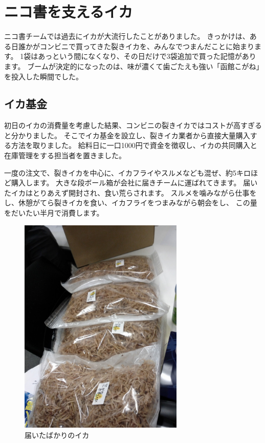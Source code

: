 \section{ニコ書を支えるイカ}

ニコ書チームでは過去にイカが大流行したことがありました。
きっかけは、ある日誰かがコンビニで買ってきた裂きイカを、みんなでつまんだことに始まります。
1袋はあっという間になくなり、その日だけで3袋追加で買った記憶があります。
ブームが決定的になったのは、味が濃くて歯ごたえも強い「函館こがね」を投入した瞬間でした。

\subsection{イカ基金}

初日のイカの消費量を考慮した結果、コンビニの裂きイカではコストが高すぎると分かりました。
そこでイカ基金を設立し、裂きイカ業者から直接大量購入する方法を取りました。
給料日に一口1000円で資金を徴収し、イカの共同購入と在庫管理をする担当者を置きました。

一度の注文で、裂きイカを中心に、イカフライやスルメなども混ぜ、約5キロほど購入します。
大きな段ボール箱が会社に届きチームに運ばれてきます。
届いたイカはとりあえず開封され、食い荒らされます。
スルメを噛みながら仕事をし、休憩がてら裂きイカを食い、イカフライをつまみながら朝会をし、
この量をだいたい半月で消費します。

\begin{figure}[H]
\centering
\includegraphics[width=0.7\textwidth]{../images/ika.jpg}
\caption{届いたばかりのイカ}
\end{figure}

